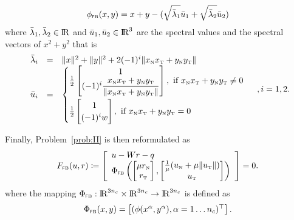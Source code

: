 {\begin{equation}
  \label{eq:Jordan-FB-1}
  \phi_{\fb}(x,y) = x+y - (\sqrt{\bar \lambda_1} \bar u_1 + \sqrt{\bar \lambda_2} \bar u_2)
\end{equation}
where $\bar\lambda_1,\bar\lambda_2\in \mathrm{I\!R}$ and $\bar u_1,\bar u_2\in\mathrm{I\!R}^3$ are the spectral values and the spectral vectors of $x^2+y^2$ that is
\begin{equation}
  \label{eq:Jordan-FB-2}
  \begin{array}{rcl}
    \bar \lambda_i&=& \|x\|^2  + \|y\|^2 +   2 (-1)^i\|x_{\n}x_{\t} +y_{\n}y_{\t}\| \\
    \bar u_i &=&
    \begin{cases}
      \frac{1}{2}
      \begin{bmatrix}
        1 \\
        (-1)^i \Frac{x_{\n}x_{\t} +y_{\n}y_{\t}}{\|x_{\n}x_{\t} +y_{\n}y_{\t}\|}
      \end{bmatrix}, \text{ if } x_{\n}x_{\t} +y_{\n}y_{\t}\neq 0 \\[5mm]
       \frac{1}{2}
      \begin{bmatrix}
        1 \\
        (-1)^i w
      \end{bmatrix}, \text{ if } x_{\n}x_{\t} +y_{\n}y_{\t} = 0 \\
    \end{cases}
\end{array}, i = 1,2.
\end{equation}

Finally,  Problem~\ref{prob:II} is then reformulated as
\begin{equation}
  \label{eq:FB-II}
   F_{\fb}(u,r) \coloneqq   \left[
     \begin{array}{l} 
       u - W r -q\\
       \Phi_{\fb}\left(
       \begin{bmatrix}
         \mu r_\n \\
         r_\t
       \end{bmatrix},
       \begin{bmatrix}
         \frac 1 \mu (u_\n+ \mu \|u_\t\|)\\
         u_\t
       \end{bmatrix}
       \right)
     \end{array}\right] 
   = 0.
 \end{equation}
 where the mapping $\Phi_{{\hbox{\tiny{\textsf FB}}}} : \mathrm{I\!R}^{3 n_c} \times \mathrm{I\!R}^{3 n_c} \rightarrow  \mathrm{I\!R}^{3 n_c} $ is defined as
 \begin{equation}
   \label{eq:FB-1}
   \Phi_{\fb}(x,y) =
   \begin{bmatrix}
     (\phi(x^\alpha,y^\alpha), \alpha = 1 \ldots n_c)^\top
   \end{bmatrix}
. \end{equation}



}
